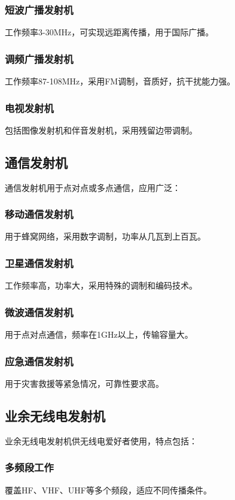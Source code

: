\documentclass[12pt,UTF8]{ctexbook}
\begin{document}
\subsubsection{短波广播发射机}
工作频率3-30MHz，可实现远距离传播，用于国际广播。

\subsubsection{调频广播发射机}
工作频率87-108MHz，采用FM调制，音质好，抗干扰能力强。

\subsubsection{电视发射机}
包括图像发射机和伴音发射机，采用残留边带调制。

\subsection{通信发射机}

通信发射机用于点对点或多点通信，应用广泛：

\subsubsection{移动通信发射机}
用于蜂窝网络，采用数字调制，功率从几瓦到上百瓦。

\subsubsection{卫星通信发射机}
工作频率高，功率大，采用特殊的调制和编码技术。

\subsubsection{微波通信发射机}
用于点对点通信，频率在1GHz以上，传输容量大。

\subsubsection{应急通信发射机}
用于灾害救援等紧急情况，可靠性要求高。

\subsection{业余无线电发射机}

业余无线电发射机供无线电爱好者使用，特点包括：

\subsubsection{多频段工作}
覆盖HF、VHF、UHF等多个频段，适应不同传播条件。
\end{document}
